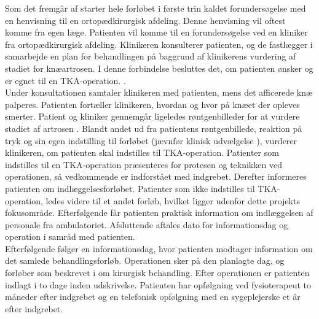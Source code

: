 Som det fremgår af  starter hele forløbet i første trin kaldet forundersøgelse med en henvisning til en ortopædkirurgisk afdeling. Denne henvisning vil oftest komme fra egen læge. Patienten vil komme til en forundersøgelse ved en kliniker fra ortopædkirurgisk afdeling. Klinikeren konsulterer patienten, og de fastlægger i samarbejde en plan for behandlingen på baggrund af klinikerens vurdering af stadiet for knæartrosen. I denne forbindelse besluttes det, om patienten ønsker og er egnet til en TKA-operation. \citep{pritka2015}. \\
Under konsultationen samtaler klinikeren med patienten, mens det afficerede knæ palperes. Patienten fortæller klinikeren, hvordan og hvor på knæet der opleves smerter. Patient og kliniker gennemgår ligeledes røntgenbilleder for at vurdere stadiet af artrosen \citep{pritka2015}.
Blandt andet ud fra patientens røntgenbillede, reaktion på tryk og sin egen indstilling til forløbet (jævnfør klinisk udvælgelse ), vurderer klinikeren, om patienten skal indstilles til TKA-operation. Patienter som indstilles til en TKA-operation præsenteres for protesen og teknikken ved operationen, så vedkommende er indforstået med indgrebet. Derefter informeres patienten om indlæggelsesforløbet. Patienter som ikke indstilles til TKA-operation, ledes videre til et andet forløb, hvilket ligger udenfor dette projekts fokusområde.
Efterfølgende får patienten praktisk information om indlæggelsen af personale fra ambulatoriet. Afsluttende aftales dato for informationsdag og operation i samråd med patienten. \citep{pritka2015} \\
Efterfølgende følger en informationsdag, hvor patienten modtager information om det samlede behandlingsforløb. Operationen sker på den planlagte dag, og forløber som beskrevet i  om kirurgisk behandling. Efter operationen er patienten indlagt i to dage inden udskrivelse. Patienten har opfølgning ved fysioterapeut to måneder efter indgrebet og en telefonisk opfølgning med en sygeplejerske et år efter indgrebet. \citep{pritka2015}
